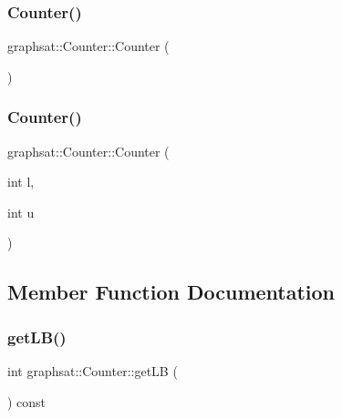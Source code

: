 \subsubsection{\texorpdfstring{Counter()}{Counter()}\hspace{0.1cm}{\footnotesize\ttfamily [1/2]}}
{\footnotesize\ttfamily graphsat\+::\+Counter\+::\+Counter (\begin{DoxyParamCaption}{ }\end{DoxyParamCaption})\hspace{0.3cm}{\ttfamily [inline]}}

\mbox{\label{classgraphsat_1_1_counter_aba7dd07985bb39b04a5858047bfbd357}} 
\subsubsection{\texorpdfstring{Counter()}{Counter()}\hspace{0.1cm}{\footnotesize\ttfamily [2/2]}}
{\footnotesize\ttfamily graphsat\+::\+Counter\+::\+Counter (\begin{DoxyParamCaption}\item[{int}]{l,  }\item[{int}]{u }\end{DoxyParamCaption})\hspace{0.3cm}{\ttfamily [inline]}}



\subsection{Member Function Documentation}
\mbox{\label{classgraphsat_1_1_counter_a9d6d9d4d32146e571e492bd042376f5e}} 
\subsubsection{\texorpdfstring{getLB()}{getLB()}}
{\footnotesize\ttfamily int graphsat\+::\+Counter\+::get\+LB (\begin{DoxyParamCaption}{ }\end{DoxyParamCaption}) const\hspace{0.3cm}{\ttfamily [inline]}}

